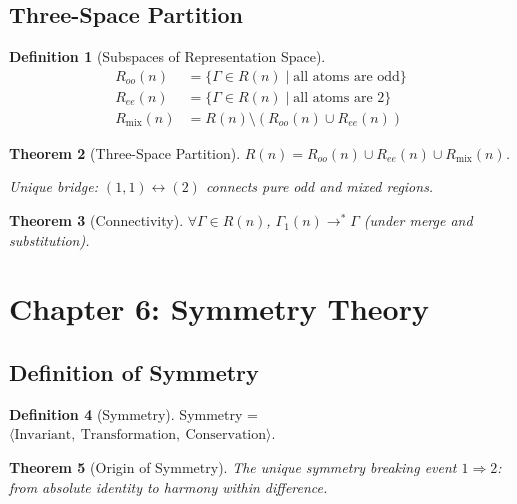 \documentclass[12pt]{article}
\newtheorem{theorem}{Theorem}[section]
\theoremstyle{definition}
\newtheorem{definition}[theorem]{Definition}
\begin{document}
\subsection{Three-Space Partition}

\begin{definition}[Subspaces of Representation Space]
\begin{align*}
R_{oo}(n) &= \{\Gamma \in R(n) \mid \text{all atoms are odd}\} \\
R_{ee}(n) &= \{\Gamma \in R(n) \mid \text{all atoms are 2}\} \\
R_{\text{mix}}(n) &= R(n) \setminus (R_{oo}(n) \cup R_{ee}(n))
\end{align*}
\end{definition}

\begin{theorem}[Three-Space Partition]
\(R(n) = R_{oo}(n) \cup R_{ee}(n) \cup R_{\text{mix}}(n)\).

Unique bridge: \((1,1) \leftrightarrow (2)\) connects pure odd and mixed regions.
\end{theorem}

\begin{theorem}[Connectivity]
\(\forall \Gamma \in R(n)\), \(\Gamma_1(n) \rightarrow^* \Gamma\) (under merge and substitution).
\end{theorem}

\newpage


\section{Chapter 6: Symmetry Theory}

\subsection{Definition of Symmetry}

\begin{definition}[Symmetry]
Symmetry = \(\langle \text{Invariant},\ \text{Transformation},\ \text{Conservation} \rangle\).
\end{definition}

\begin{theorem}[Origin of Symmetry]
The unique symmetry breaking event \(1 \Rightarrow 2\): from absolute identity to harmony within difference.
\end{theorem}
\end{document}
